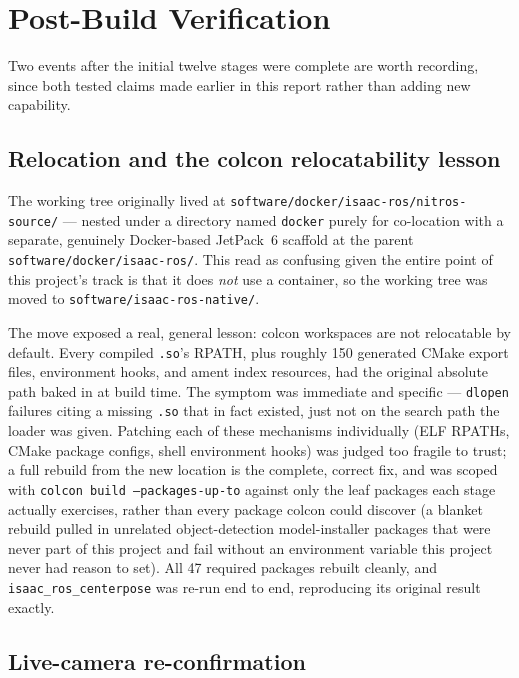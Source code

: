 \documentclass[11pt,a4paper]{article}
\begin{document}
\section{Post-Build Verification}
\label{sec:postbuild}

Two events after the initial twelve stages were complete are worth
recording, since both tested claims made earlier in this report rather
than adding new capability.

\subsection{Relocation and the colcon relocatability lesson}

The working tree originally lived at
\texttt{software/docker/isaac-ros/nitros-source/} --- nested under a
directory named \texttt{docker} purely for co-location with a separate,
genuinely Docker-based JetPack~6 scaffold at the parent
\texttt{software/docker/isaac-ros/}. This read as confusing given the
entire point of this project's track is that it does \emph{not} use a
container, so the working tree was moved to
\texttt{software/isaac-ros-native/}.

The move exposed a real, general lesson: colcon workspaces are not
relocatable by default. Every compiled \texttt{.so}'s RPATH, plus roughly
150 generated CMake export files, environment hooks, and ament index
resources, had the original absolute path baked in at build time. The
symptom was immediate and specific --- \texttt{dlopen} failures citing a
missing \texttt{.so} that in fact existed, just not on the search path
the loader was given. Patching each of these mechanisms individually
(ELF RPATHs, CMake package configs, shell environment hooks) was judged
too fragile to trust; a full rebuild from the new location is the
complete, correct fix, and was scoped with \texttt{colcon build
--packages-up-to} against only the leaf packages each stage actually
exercises, rather than every package colcon could discover (a blanket
rebuild pulled in unrelated object-detection model-installer packages
that were never part of this project and fail without an environment
variable this project never had reason to set). All 47 required packages
rebuilt cleanly, and \texttt{isaac\_ros\_centerpose} was re-run end to
end, reproducing its original result exactly.

\subsection{Live-camera re-confirmation}
\end{document}
